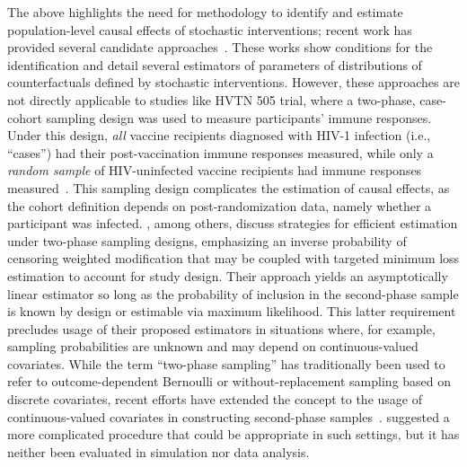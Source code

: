 
The above highlights the need for methodology to identify and estimate
population-level causal effects of stochastic interventions; recent work has
provided several candidate approaches~\citep{diaz2012population,
haneuse2013estimation}. These works show conditions for the identification and
detail several estimators of parameters of distributions of counterfactuals
defined by stochastic interventions. However, these approaches are not directly
applicable to studies like HVTN 505 trial, where a two-phase, case-cohort
sampling design was used to measure participants' immune responses. Under this
design, \textit{all} vaccine recipients diagnosed with HIV-1 infection (i.e.,
``cases'') had their post-vaccination immune responses measured, while only
a \textit{random sample} of HIV-uninfected vaccine recipients had immune
responses measured~\citep{janes2017higher}. This sampling design complicates the
estimation of causal effects, as the cohort definition depends on
post-randomization data, namely whether a participant was infected.
\citet{rose2011targeted2sd}, among others, discuss strategies for efficient
estimation under two-phase sampling designs, emphasizing an inverse probability
of censoring weighted modification that may be coupled with targeted minimum
loss estimation to account for study design. Their approach yields an
asymptotically linear estimator so long as the probability of inclusion in the
second-phase sample is known by design or estimable via maximum likelihood. This
latter requirement precludes usage of their proposed estimators in situations
where, for example, sampling probabilities are unknown and may depend on
continuous-valued covariates. While the term ``two-phase sampling'' has
traditionally been used to refer to outcome-dependent Bernoulli or
without-replacement sampling based on discrete covariates, recent efforts have
extended the concept to the usage of continuous-valued covariates in
constructing second-phase samples~\citep[e.g.,][]{gilbert2014optimal}.
\citet{rose2011targeted2sd} suggested a more complicated procedure that could be
appropriate in such settings, but it has neither been evaluated in simulation
nor data analysis.

